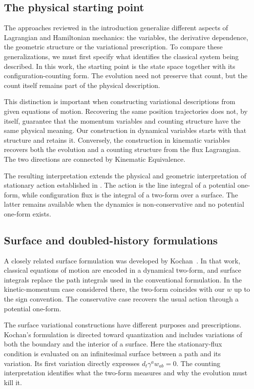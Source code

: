 \documentclass[12pt]{article}
\begin{document}
\subsection{The physical starting point}

The approaches reviewed in the introduction generalize different aspects of Lagrangian and Hamiltonian mechanics: the variables, the derivative dependence, the geometric structure or the variational prescription. To compare these generalizations, we must first specify what identifies the classical system being described. In this work, the starting point is the state space together with its configuration-counting form. The evolution need not preserve that count, but the count itself remains part of the physical description.

This distinction is important when constructing variational descriptions from given equations of motion. Recovering the same position trajectories does not, by itself, guarantee that the momentum variables and counting structure have the same physical meaning. Our construction in dynamical variables starts with that structure and retains it. Conversely, the construction in kinematic variables recovers both the evolution and a counting structure from the flux Lagrangian. The two directions are connected by Kinematic Equivalence.

The resulting interpretation extends the physical and geometric interpretation of stationary action established in \cite{geoact}. The action is the line integral of a potential one-form, while configuration flux is the integral of a two-form over a surface. The latter remains available when the dynamics is non-conservative and no potential one-form exists.

\subsection{Surface and doubled-history formulations}

A closely related surface formulation was developed by Kochan~\cite{kochanstrings,kochan}. In that work, classical equations of motion are encoded in a dynamical two-form, and surface integrals replace the path integrals used in the conventional formulation. In the kinetic-momentum case considered there, the two-form coincides with our $w$ up to the sign convention. The conservative case recovers the usual action through a potential one-form.

The surface variational constructions have different purposes and prescriptions. Kochan's formulation is directed toward quantization and includes variations of both the boundary and the interior of a surface. Here the stationary-flux condition is evaluated on an infinitesimal surface between a path and its variation. Its first variation directly expresses $d_t\gamma^a w_{ab}=0$. The counting interpretation identifies what the two-form measures and why the evolution must kill it.
\end{document}
